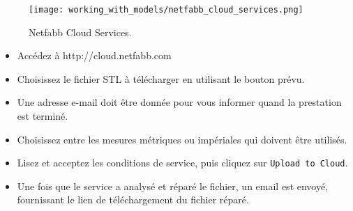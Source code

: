 \begin{figure}[H]
\centering
\texttt{[image: working\_with\_models/netfabb\_cloud\_services.png]}
\caption{Netfabb Cloud Services.}
\label{fig:netfabb_cloud_services}
\end{figure}

\begin{itemize}
	\item Accédez à http://cloud.netfabb.com
	\item Choisissez le fichier STL à télécharger en utilisant le bouton prévu.
	\item Une adresse e-mail doit être donnée pour vous informer quand la prestation est terminé.
	\item Choisissez entre les mesures métriques ou impériales qui doivent être utilisés.
	\item Lisez et acceptez les conditions de service, puis cliquez sur \texttt{Upload to Cloud}.
	\item Une fois que le service a analysé et réparé le fichier, un email est envoyé, fournissant le lien de téléchargement du fichier réparé.
\end{itemize}
